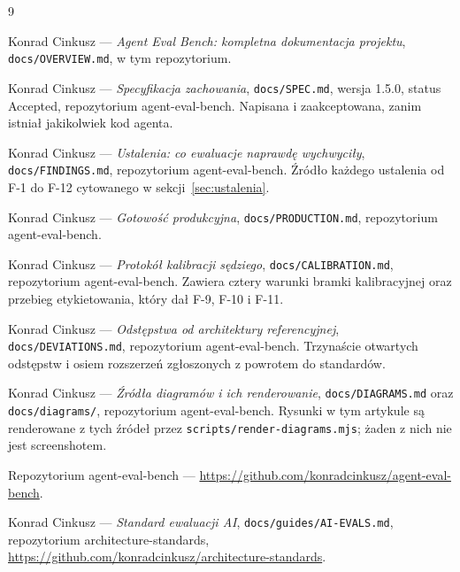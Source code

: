 \documentclass[11pt,a4paper]{article}
\begin{document}
\begin{thebibliography}{9}

Konrad Cinkusz --- \textit{Agent Eval Bench: kompletna dokumentacja projektu},
\texttt{docs/OVERVIEW.md}, w tym repozytorium.

Konrad Cinkusz --- \textit{Specyfikacja zachowania}, \texttt{docs/SPEC.md},
wersja 1.5.0, status Accepted, repozytorium agent-eval-bench. Napisana i
zaakceptowana, zanim istniał jakikolwiek kod agenta.

Konrad Cinkusz --- \textit{Ustalenia: co ewaluacje naprawdę wychwyciły},
\texttt{docs/FINDINGS.md}, repozytorium agent-eval-bench. Źródło każdego
ustalenia od F-1 do F-12 cytowanego w sekcji~\ref{sec:ustalenia}.

Konrad Cinkusz --- \textit{Gotowość produkcyjna}, \texttt{docs/PRODUCTION.md},
repozytorium agent-eval-bench.

Konrad Cinkusz --- \textit{Protokół kalibracji sędziego},
\texttt{docs/CALIBRATION.md}, repozytorium agent-eval-bench. Zawiera cztery
warunki bramki kalibracyjnej oraz przebieg etykietowania, który dał F-9, F-10 i
F-11.

Konrad Cinkusz --- \textit{Odstępstwa od architektury referencyjnej},
\texttt{docs/DEVIATIONS.md}, repozytorium agent-eval-bench. Trzynaście otwartych
odstępstw i osiem rozszerzeń zgłoszonych z powrotem do standardów.

Konrad Cinkusz --- \textit{Źródła diagramów i ich renderowanie},
\texttt{docs/DIAGRAMS.md} oraz \texttt{docs/diagrams/}, repozytorium
agent-eval-bench. Rysunki w tym artykule są renderowane z tych źródeł przez
\texttt{scripts/render-diagrams.mjs}; żaden z nich nie jest screenshotem.

Repozytorium agent-eval-bench ---
\url{https://github.com/konradcinkusz/agent-eval-bench}.

Konrad Cinkusz --- \textit{Standard ewaluacji AI},
\texttt{docs/guides/AI-EVALS.md}, repozytorium architecture-standards,
\url{https://github.com/konradcinkusz/architecture-standards}.

\end{thebibliography}
\end{document}
